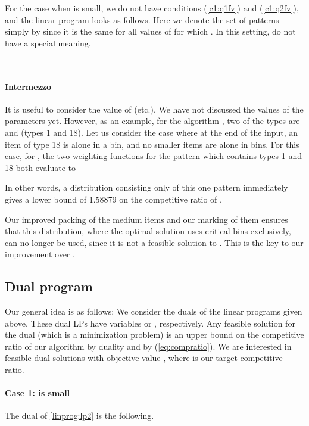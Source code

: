 For the case {when  is small}, we do not have conditions
(\ref{c1:q1fv}) and (\ref{c1:q2fv}), and
the linear program  looks as follows.
Here we denote the set of patterns simply by  since it is the same for all values of 
for which . In this setting,  do not have a special meaning.

\LPblocktag{}{\label{linprog:lp2}}\begin{minipage}{\linewidth-2cm}
	~
\end{minipage}
\vspace{-20pt}
\paragraph{Intermezzo}
It is useful to consider the value of  (etc.).
We have not discussed the values of the parameters yet. However, as an example, 
for the algorithm {\Hpp}, two of the types are  and  (types 1 and 18).
Let us consider the case where at the end of the input, an item of type
18 is alone in a bin, and no smaller items are alone in bins.
For this case, for {\Hpp}, the two weighting functions for the pattern which contains types 1 and 18 both evaluate to

In other words, a distribution  consisting only of this one pattern immediately gives a lower bound of 1.58879 on the competitive ratio of {\Hpp}. 

Our improved packing of the medium items and our marking of them ensures that this distribution, where the optimal solution uses critical bins exclusively, can no longer be used, since it is not a feasible solution to . This is the key to our improvement over \Hpp.

\subsection{Dual program}
\label{sec:dual}

Our general idea is as follows: We consider the duals of the linear programs given above. These dual LPs have variables  or , respectively. Any feasible solution for the dual (which is a minimization problem) is an upper bound on the competitive ratio of our algorithm by duality and by (\ref{eq:compratio}). We are interested in feasible dual solutions with objective value , where  is our target competitive ratio. 

\paragraph{Case 1:   is small}
The dual of \ref{linprog:lp2} is the following. 

